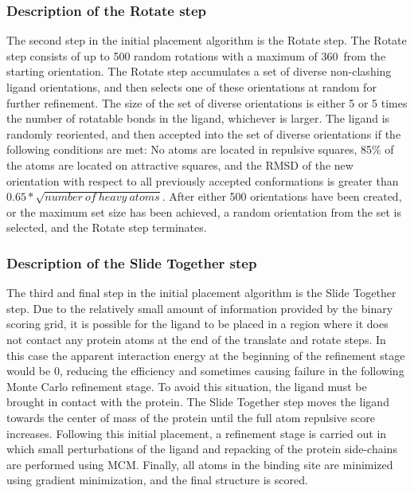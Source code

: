 \subsubsection{Description of the Rotate step}
The second step in the initial placement algorithm is the Rotate step.
The Rotate step consists of up to 500 random rotations with a maximum of 360\textdegree\ from the starting orientation.
The Rotate step accumulates a set of diverse non-clashing ligand orientations, and then selects one of these orientations at random for further refinement.
The size of the set of diverse orientations is either 5 or 5 times the number of rotatable bonds in the ligand, whichever is larger.
The ligand is randomly reoriented, and then accepted into the set of diverse orientations if the following conditions are met: No atoms are located in repulsive squares, 85\% of the atoms are located on attractive squares, and the \ac{RMSD} of the new orientation with respect to all previously accepted conformations is greater than $0.65*\sqrt{number\ of\ heavy\ atoms}$.
After either 500 orientations have been created, or the maximum set size has been achieved, a random orientation from the set is selected, and the Rotate step terminates.

\subsubsection{Description of the Slide Together step}
The third and final step in the initial placement algorithm is the Slide Together step.
Due to the relatively small amount of information provided by the binary scoring grid, it is possible for the ligand to be placed in a region where it does not contact any protein atoms at the end of the translate and rotate steps.
In this case the apparent interaction energy at the beginning of the refinement stage would be 0, reducing the efficiency and sometimes causing failure in the following Monte Carlo refinement stage.
To avoid this situation, the ligand must be brought in contact with the protein.
The Slide Together step moves the ligand towards the center of mass of the protein until the full atom repulsive score increases. 
Following this initial placement, a refinement stage is carried out in which small perturbations of the ligand and repacking of the protein side-chains are performed using \ac{MCM}.
Finally, all atoms in the binding site are minimized using gradient minimization, and the final structure is scored.

